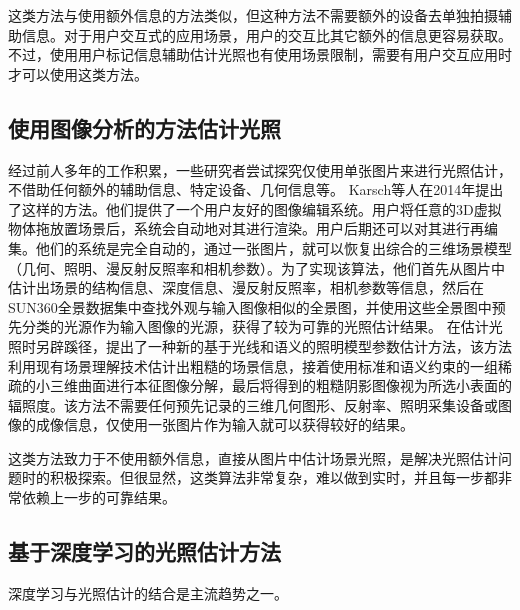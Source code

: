 这类方法与使用额外信息的方法类似，但这种方法不需要额外的设备去单独拍摄辅助信息。对于用户交互式的应用场景，用户的交互比其它额外的信息更容易获取。不过，使用用户标记信息辅助估计光照也有使用场景限制，需要有用户交互应用时才可以使用这类方法。
\subsection{使用图像分析的方法估计光照}
经过前人多年的工作积累，一些研究者尝试探究仅使用单张图片来进行光照估计，不借助任何额外的辅助信息、特定设备、几何信息等。
Karsch等人\cite{karsch2014automatic}在2014年提出了这样的方法。他们提供了一个用户友好的图像编辑系统。用户将任意的3D虚拟物体拖放置场景后，系统会自动地对其进行渲染。用户后期还可以对其进行再编集。他们的系统是完全自动的，通过一张图片，就可以恢复出综合的三维场景模型（几何、照明、漫反射反照率和相机参数）。为了实现该算法，他们首先从图片中估计出场景的结构信息、深度信息、漫反射反照率，相机参数等信息，然后在SUN360全景数据集\cite{xiao2012recognizing}中查找外观与输入图像相似的全景图，并使用这些全景图中预先分类的光源作为输入图像的光源，获得了较为可靠的光照估计结果。
\cite{chen2014lighting}在估计光照时另辟蹊径，提出了一种新的基于光线和语义的照明模型参数估计方法，该方法利用现有场景理解技术估计出粗糙的场景信息，接着使用标准和语义约束的一组稀疏的小三维曲面进行本征图像分解，最后将得到的粗糙阴影图像视为所选小表面的辐照度。该方法不需要任何预先记录的三维几何图形、反射率、照明采集设备或图像的成像信息，仅使用一张图片作为输入就可以获得较好的结果。

这类方法致力于不使用额外信息，直接从图片中估计场景光照，是解决光照估计问题时的积极探索。但很显然，这类算法非常复杂，难以做到实时，并且每一步都非常依赖上一步的可靠结果。
\subsection{基于深度学习的光照估计方法}


深度学习与光照估计的结合是主流趋势之一。